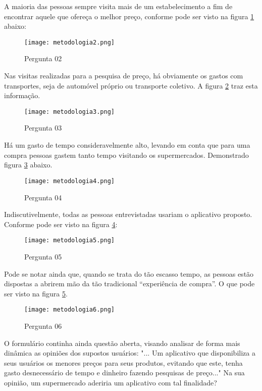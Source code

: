 A maioria das pessoas sempre visita mais de um estabelecimento a fim de encontrar aquele que ofereça o melhor preço, conforme pode ser visto na figura \ref{fig:metodologia2} abaixo:

\begin{figure}[H]
    \centering
		\caption{Pergunta 02}
		\texttt{[image: metodologia2.png]}
		\label{fig:metodologia2}
\end{figure}

Nas visitas realizadas para a pesquisa de preço, há obviamente os gastos com transportes, seja de automóvel próprio ou transporte coletivo. A figura \ref{fig:metodologia3} traz esta informação.

\begin{figure}[H]
    \centering
		\caption{Pergunta 03}
		\texttt{[image: metodologia3.png]}
		\label{fig:metodologia3}
\end{figure}

Há um gasto de tempo consideravelmente alto, levando em conta que para uma compra pessoas gastem tanto tempo visitando os supermercados. Demonstrado figura \ref{fig:metodologia4} abaixo.

\begin{figure}[H]
    \centering
		\caption{Pergunta 04}
		\texttt{[image: metodologia4.png]}
		\label{fig:metodologia4}
\end{figure}

Indiscutivelmente, todas as pessoas entrevistadas usariam o aplicativo proposto. Conforme pode ser visto na figura \ref{fig:metodologia5}:
\begin{figure}[H]
    \centering
		\caption{Pergunta 05}
		\texttt{[image: metodologia5.png]}
		\label{fig:metodologia5}
\end{figure}

Pode se notar ainda que, quando se trata do tão escasso tempo, as pessoas estão dispostas a  abrirem mão da tão tradicional “experiência de compra”. O que pode ser visto na figura \ref{fig:metodologia6}.

\begin{figure}[H]
    \centering
		\caption{Pergunta 06}
		\texttt{[image: metodologia6.png]}
		\label{fig:metodologia6}
\end{figure}

O formulário continha ainda questão aberta, visando analisar de forma mais dinâmica as opiniões dos supostos usuários: "... Um aplicativo que disponibiliza a seus usuários os menores preços para seus produtos, evitando que este, tenha gasto desnecessário de tempo e dinheiro fazendo pesquisas de preço..."
Na sua opinião, um supermercado aderiria um aplicativo com tal finalidade?

